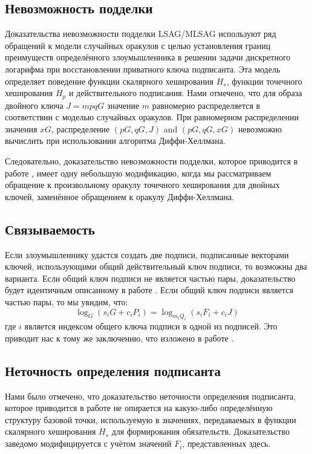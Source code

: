 \documentclass{mrl}
\begin{document}
\subsection{Невозможность подделки}
Доказательства невозможности подделки LSAG/MLSAG используют ряд обращений к модели случайных оракулов с целью установления границ преимуществ определённого злоумышленника в решении задачи дискретного логарифма при восстановлении приватного ключа подписанта. Эта модель определяет поведение функции скалярного хеширования $H_s$, функции точечного хеширования $H_p$ и действительного подписания. Нами отмечено, что для образа двойного ключа $J = mpqG$ значение $m$ равномерно распределяется в соответствии с моделью случайных оракулов. При равномерном распределении значения $xG$, распределение $(pG,qG,J)$ and $(pG,qG,xG)$ невозможно вычислить при использовании алгоритма Диффи-Хеллмана.

Следовательно, доказательство невозможности подделки, которое приводится в работе \cite{shen}, имеет одну небольшую модификацию, когда мы рассматриваем обращение к произвольному оракулу точечного хеширования для двойных ключей, заменённое обращением к оракулу Диффи-Хеллмана.

\subsection{Связываемость}
Если злоумышленнику удастся создать две подписи, подписанные векторами ключей, использующими общий действительный ключ подписи, то возможны два варианта. Если общий ключ подписи не является частью пары, доказательство будет идентичным описанному в работе \cite{shen}. Если общий ключ подписи является частью пары, то мы увидим, что: $$\log_G(s_iG + c_iP_i) = \log_{m_iQ_i}(s_iF_i + c_iJ)$$ где $i$ является индексом общего ключа подписи в одной из подписей. Это приводит нас к тому же заключению, что изложено в работе \cite{shen}.

\subsection{Неточность определения подписанта}
Нами было отмечено, что доказательство неточности определения подписанта, которое приводится в работе \cite{shen} не опирается на какую-либо определённую структуру базовой точки, используемую в значениях, передаваемых в функции скалярного хеширования $H_s$ для формирования обязательств. Доказательство заведомо модифицируется с учётом значений $F_i$, представленных здесь.
\end{document}
